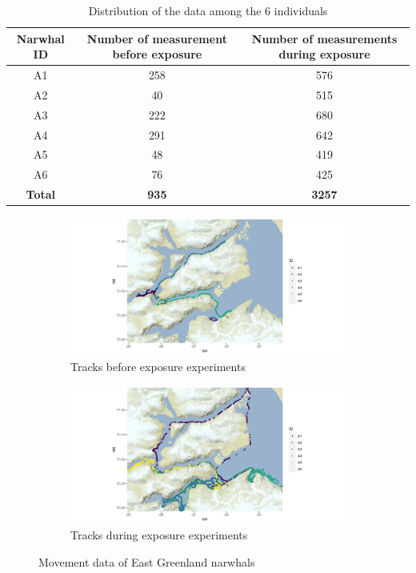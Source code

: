 \documentclass[11pt]{article}
\newcommand {\1}{\mathbb{1}}
\begin{document}
\begin{table}[H]
	\centering
	\begin{tabular}{|c|c|c|}
		\hline
		Narwhal ID & Number of measurement before exposure & Number of measurements during exposure \\
		\hline
		A1 & 258 & 576\\
		\hline
		A2  & 40 & 515 \\
		\hline
		A3 & 222 & 680 \\
		\hline
		A4 & 291 & 642  \\
		\hline
		A5 & 48 & 419\\
		\hline
		A6 & 76 & 425 \\
		\hline
		\textbf{Total} & \textbf{935} & \textbf{3257} \\
		\hline
	\end{tabular}
	\caption{Distribution of the data among the 6 individuals}
	\label{table: data distribution}
\end{table}

\begin{figure}[H]
	\centering
	\begin{subfigure}{0.49\textwidth}
		\centering
		\includegraphics[scale=0.38]{images/data_exploration/all_tracksBE.png}
		\caption{Tracks before exposure experiments}
	\end{subfigure}
	\begin{subfigure}{0.49\textwidth}
		\centering
		\includegraphics[scale=0.38]{images/data_exploration/all_tracksAE.png}
		\caption{Tracks during exposure experiments}
	\end{subfigure}
	\caption{Movement data of East Greenland narwhals}
	\label{fig: tracks before and after exposure}
\end{figure}
\end{document}
